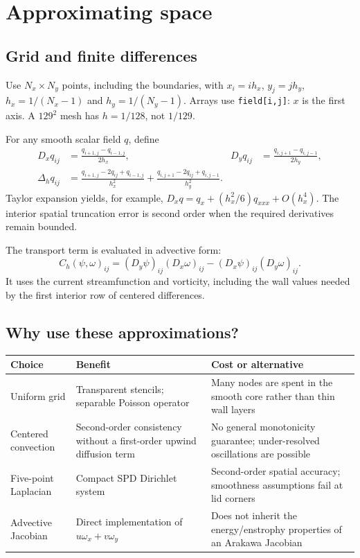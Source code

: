 \documentclass[11pt,a4paper]{article}
\newcommand{\code}[1]{\texttt{#1}}
\begin{document}
\clearpage
\section{Approximating space}
\subsection{Grid and finite differences}
Use $N_x\times N_y$ points, including the boundaries, with
$x_i=i h_x$, $y_j=j h_y$, $h_x=1/(N_x-1)$ and $h_y=1/(N_y-1)$.
Arrays use \code{field[i,j]}: $x$ is the first axis. A $129^2$ mesh has
$h=1/128$, not $1/129$.

For any smooth scalar field $q$, define
\begin{align}
D_xq_{ij}&=\frac{q_{i+1,j}-q_{i-1,j}}{2h_x},&
D_yq_{ij}&=\frac{q_{i,j+1}-q_{i,j-1}}{2h_y},\\
\Delta_hq_{ij}&=\frac{q_{i+1,j}-2q_{ij}+q_{i-1,j}}{h_x^2}
+\frac{q_{i,j+1}-2q_{ij}+q_{i,j-1}}{h_y^2}.\label{eq:lap}
\end{align}
Taylor expansion yields, for example,
$D_xq=q_x+(h_x^2/6)q_{xxx}+O(h_x^4)$. The interior spatial truncation error is
second order when the required derivatives remain bounded.

The transport term is evaluated in advective form:
\begin{equation}
C_h(\psi,\omega)_{ij}=(D_y\psi)_{ij}(D_x\omega)_{ij}
-(D_x\psi)_{ij}(D_y\omega)_{ij}.\label{eq:conv}
\end{equation}
It uses the current streamfunction and vorticity, including the wall values
needed by the first interior row of centered differences.

\subsection{Why use these approximations?}
\begin{tabularx}{\linewidth}{@{}>{\raggedright\arraybackslash}p{3.1cm}YY@{}}
\toprule
Choice & Benefit & Cost or alternative\\\midrule
Uniform grid & Transparent stencils; separable Poisson operator & Many nodes are spent in the smooth core rather than thin wall layers\\
Centered convection & Second-order consistency without a first-order upwind diffusion term & No general monotonicity guarantee; under-resolved oscillations are possible\\
Five-point Laplacian & Compact SPD Dirichlet system & Second-order spatial accuracy; smoothness assumptions fail at lid corners\\
Advective Jacobian & Direct implementation of $u\omega_x+v\omega_y$ & Does not inherit the energy/enstrophy properties of an Arakawa Jacobian\\
\bottomrule
\end{tabularx}
\end{document}
